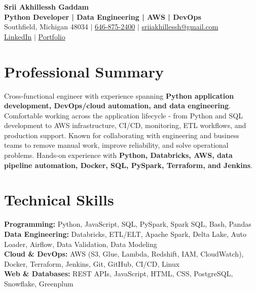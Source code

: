 \documentclass[letterpaper,10pt]{article}
\begin{document}
\fontsize{9.35pt}{10.45pt}\selectfont

\begin{center}
    {\LARGE \textbf{Srii Akhillessh Gaddam}} \\[-1pt]
    \textbf{Python Developer | Data Engineering | AWS | DevOps} \\[2pt]
    Southfield, Michigan 48034 $|$
    \href{tel:6468752400}{646-875-2400} $|$
    \href{mailto:sriiakhillessh@gmail.com}{sriiakhillessh@gmail.com} \\[1pt]
    \href{https://www.linkedin.com/in/srii-akhiilessh-gaddam-b48668191/}{LinkedIn} $|$
    \href{https://sriiakhillesshg.github.io/portfolio/}{Portfolio}
\end{center}
\vspace{-8pt}

\section{Professional Summary}
\small{Cross-functional engineer with experience spanning \textbf{Python application development, DevOps/cloud automation, and data engineering}. Comfortable working across the application lifecycle - from Python and SQL development to AWS infrastructure, CI/CD, monitoring, ETL workflows, and production support. Known for collaborating with engineering and business teams to remove manual work, improve reliability, and solve operational problems. Hands-on experience with \textbf{Python, Databricks, AWS, data pipeline automation, Docker, SQL, PySpark, Terraform, and Jenkins}.}

\section{Technical Skills}
\small{
\textbf{Programming:} Python, JavaScript, SQL, PySpark, Spark SQL, Bash, Pandas \\
\textbf{Data Engineering:} Databricks, ETL/ELT, Apache Spark, Delta Lake, Auto Loader, Airflow, Data Validation, Data Modeling \\
\textbf{Cloud \& DevOps:} AWS (S3, Glue, Lambda, Redshift, IAM, CloudWatch), Docker, Terraform, Jenkins, Git, GitHub, CI/CD, Linux \\
\textbf{Web \& Databases:} REST APIs, JavaScript, HTML, CSS, PostgreSQL, Snowflake, Greenplum
}
\end{document}
